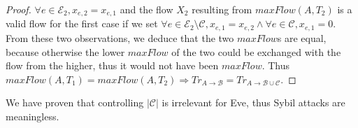 \documentclass[11pt]{article}
\theoremstyle{definition}
\theoremstyle{corollary}
\theoremstyle{lemma}
\begin{document}
\begin{proof}
       $\forall e \in \mathcal{E}_2, x_{e,2} = x_{e,1}$ and the flow $X_2$ resulting from $maxFlow(A, T_2)$ is a valid
       flow for the first case if we set $\forall e \in \mathcal{E}_2 \setminus \mathcal{C}, x_{e,1} = x_{e,2} \wedge
       \forall e \in \mathcal{C}, x_{e,1} = 0$. From these two observations, we deduce that the two $maxFlow$s are equal,
       because otherwise the lower $maxFlow$ of the two could be exchanged with the flow from the higher, thus it would not
       have been $maxFlow$. Thus $maxFlow(A, T_1) = maxFlow(A, T_2) \Rightarrow Tr_{A \rightarrow \mathcal{B}} = Tr_{A
       \rightarrow \mathcal{B} \cup \mathcal{C}}$.
    \end{proof}
    We have proven that controlling $|\mathcal{C}|$ is irrelevant for Eve, thus Sybil attacks are meaningless. \\
\end{document}
